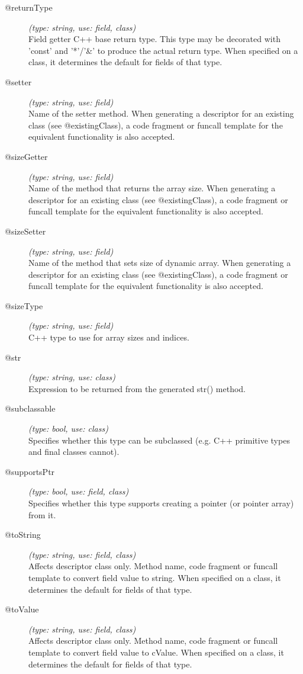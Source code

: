 \begin{description}
\item[@returnType] \textit{(type: string, use: field, class)} \\
  Field getter C++ base return type. This type may be decorated with 'const'
  and '*'/'\&' to produce the actual return type. When specified on a class,
  it determines the default for fields of that type.

\item[@setter] \textit{(type: string, use: field)} \\
  Name of the setter method. When generating a descriptor for an existing
  class (see @existingClass), a code fragment or funcall template for the
  equivalent functionality is also accepted.

\item[@sizeGetter] \textit{(type: string, use: field)} \\
  Name of the method that returns the array size. When generating a descriptor
  for an existing class (see @existingClass), a code fragment or funcall
  template for the equivalent functionality is also accepted.

\item[@sizeSetter] \textit{(type: string, use: field)} \\
  Name of the method that sets size of dynamic array. When generating a
  descriptor for an existing class (see @existingClass), a code fragment or
  funcall template for the equivalent functionality is also accepted.

\item[@sizeType] \textit{(type: string, use: field)} \\
  C++ type to use for array sizes and indices.

\item[@str] \textit{(type: string, use: class)} \\
  Expression to be returned from the generated str() method.

\item[@subclassable] \textit{(type: bool, use: class)} \\
  Specifies whether this type can be subclassed (e.g. C++ primitive types and
  final classes cannot).

\item[@supportsPtr] \textit{(type: bool, use: field, class)} \\
  Specifies whether this type supports creating a pointer (or pointer array)
  from it.

\item[@toString] \textit{(type: string, use: field, class)} \\
  Affects descriptor class only. Method name, code fragment or funcall
  template to convert field value to string. When specified on a class, it
  determines the default for fields of that type.

\item[@toValue] \textit{(type: string, use: field, class)} \\
  Affects descriptor class only. Method name, code fragment or funcall
  template to convert field value to cValue. When specified on a class, it
  determines the default for fields of that type.

\end{description}



